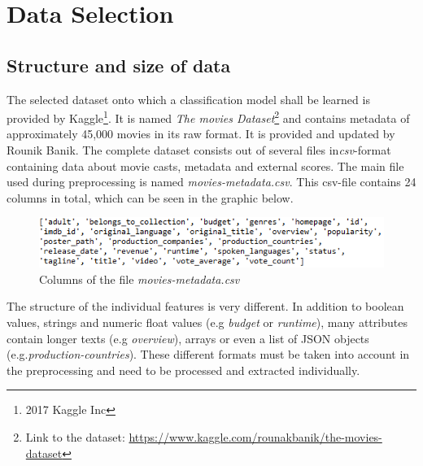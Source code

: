 \chapter{Data Selection}
\label{cha:data_selection}

\section{Structure and size of data}
The selected dataset onto which a classification model shall be learned is provided by Kaggle\footnote{2017 Kaggle Inc}. It is named \textit{The movies Dataset}\footnote{Link to the dataset: \hyperref[https://www.kaggle.com/rounakbanik/the-movies-dataset]{https://www.kaggle.com/rounakbanik/the-movies-dataset}} and contains metadata of approximately 45,000 movies in its raw format. It is provided and updated by Rounik Banik. The complete dataset consists out of several files in\textit{csv}-format containing data about movie casts, metadata and external scores. The main file used during preprocessing is named \textit{movies-metadata.csv}. This csv-file contains 24 columns in total, which can be seen in the graphic below.
\begin{figure}[ht]
	\centering
		\includegraphics[width=\textwidth]{images/Raw_dataset_headers.png}
	\caption{Columns of the file \textit{movies-metadata.csv}}
\end{figure}


The structure of the individual features is very different. In addition to boolean values, strings and numeric float values (e.g \textit{budget} or \textit{runtime}), many attributes contain longer texts (e.g \textit{overview}), arrays or even a list of JSON objects (e.g.\textit{production-countries}). These different formats must be taken into account in the preprocessing and need to be processed and extracted individually.


